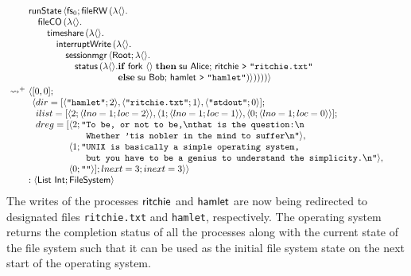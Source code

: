 \documentclass[12pt,phd,lfcs,twoside,openright,logo,leftchapter,normalheadings]{infthesis}
\theoremstyle{plain}
\theoremstyle{definition}
\begin{document}
\[
  \ba{@{~}l@{~}l}
    &\bl
    \runState\,\Record{\dec{fs}_0;\fileRW\,(\lambda\Unit.\\
         \quad\fileAlloc\,(\lambda\Unit.\\
         \qquad\timeshare\,(\lambda\Unit.\\
         \qquad\quad\dec{interruptWrite}\,(\lambda\Unit.\\
         \qquad\qquad\sessionmgr\,\Record{\Root;\lambda\Unit.\\
         \qquad\qquad\quad\status\,(\lambda\Unit.
                 \ba[t]{@{}l}
                   \If\;\fork~\Unit\;\Then\;
                       \su~\Alice;\,
                       \quoteRitchie~\redirect~\strlit{ritchie.txt}\\
                   \Else\;
                       \su~\Bob;\,
                       \quoteHamlet~\redirect~\strlit{hamlet})}))))}
                 \ea
     \el \smallskip\\
     \reducesto^+&
     \bl
      \Record{
       \ba[t]{@{}l}
       [0, 0];\\
       \Record{
         \ba[t]{@{}l}
           dir=[\Record{\strlit{hamlet};2},
                \Record{\strlit{ritchie.txt};1},
                \Record{\strlit{stdout};0}];\\
           ilist=[\Record{2;\Record{lno=1;loc=2}},
                  \Record{1;\Record{lno=1;loc=1}},
                  \Record{0;\Record{lno=1;loc=0}}];\\
           dreg=[
             \ba[t]{@{}l}
               \Record{2;
                 \ba[t]{@{}l@{}l}
                   \texttt{"}&\texttt{To be, or not to be,\nl{}that is the question:\nl{}}\\
                             &\texttt{Whether 'tis nobler in the mind to suffer\nl{}"}},
                 \ea\\
               \Record{1;
                 \ba[t]{@{}l@{}l}
                   \texttt{"}&\texttt{UNIX is basically a simple operating system, }\\
                             &\texttt{but you have to be a genius to understand the simplicity.\nl{"}}},
                 \ea\\
                 \Record{0; \strlit{}}]; lnext=3; inext=3}}\\
           \ea
         \ea
       \ea\\
       : \Record{\List~\Int; \FileSystem}
     \el
  \ea
\]
%
The writes of the processes $\mathsf{ritchie}$ and $\mathsf{hamlet}$ are now
being redirected to designated files \texttt{ritchie.txt} and
\texttt{hamlet}, respectively. The operating system returns the
completion status of all the processes along with the current state of
the file system such that it can be used as the initial file system
state on the next start of the operating system.
\end{document}
